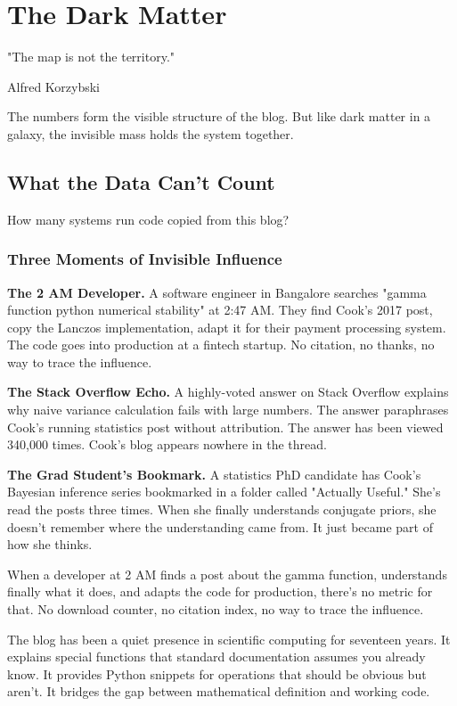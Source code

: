 \chapter{The Dark Matter}

\nopagebreak
\epigraph{"The map is not the territory."}{Alfred Korzybski}
\nopagebreak

The numbers form the visible structure of the blog. But like dark matter in a galaxy, the invisible mass holds the system together.

\bigskip

\section*{What the Data Can't Count}

How many systems run code copied from this blog?

\subsection*{Three Moments of Invisible Influence}

\textbf{The 2 AM Developer.} A software engineer in Bangalore searches "gamma function python numerical stability" at 2:47 AM. They find Cook's 2017 post, copy the Lanczos implementation, adapt it for their payment processing system. The code goes into production at a fintech startup. No citation, no thanks, no way to trace the influence.

\textbf{The Stack Overflow Echo.} A highly-voted answer on Stack Overflow explains why naive variance calculation fails with large numbers. The answer paraphrases Cook's running statistics post without attribution. The answer has been viewed 340,000 times. Cook's blog appears nowhere in the thread.

\textbf{The Grad Student's Bookmark.} A statistics PhD candidate has Cook's Bayesian inference series bookmarked in a folder called "Actually Useful." She's read the posts three times. When she finally understands conjugate priors, she doesn't remember where the understanding came from. It just became part of how she thinks.

\bigskip

When a developer at 2 AM finds a post about the gamma function, understands finally what it does, and adapts the code for production, there's no metric for that. No download counter, no citation index, no way to trace the influence.

The blog has been a quiet presence in scientific computing for seventeen years. It explains special functions that standard documentation assumes you already know. It provides Python snippets for operations that should be obvious but aren't. It bridges the gap between mathematical definition and working code.

